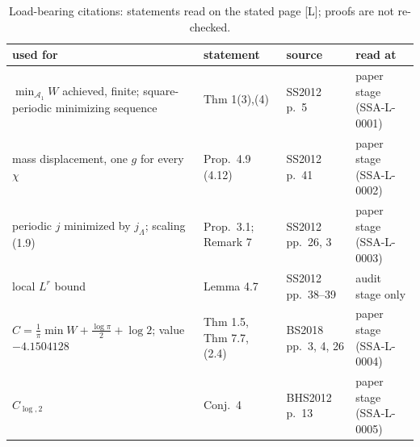 \documentclass[10pt]{article}
\newcommand{\tier}[1]{\textsf{[#1]}}
\begin{document}
\begin{table}[t]\centering\small
\caption{Load-bearing citations: statements read on the stated page \tier{L}; proofs are not re-checked.}\label{tab:cit}
\begin{tabular}{p{4.2cm}p{4.0cm}p{2.2cm}p{2.8cm}}\toprule used for & statement & source & read at\\\midrule
$\min_{\mathcal A_1}W$ achieved, finite; square-periodic minimizing sequence & Thm 1(3),(4) & SS2012 p.~5 & paper stage (SSA-L-0001)\\
mass displacement, one $g$ for every $\chi$ & Prop.\ 4.9 (4.12) & SS2012 p.~41 & paper stage (SSA-L-0002)\\
periodic $j$ minimized by $j_\Lambda$; scaling (1.9) & Prop.\ 3.1; Remark 7 & SS2012 pp.~26, 3 & paper stage (SSA-L-0003)\\
local $L^r$ bound & Lemma 4.7 & SS2012 pp.~38--39 & audit stage only\\
$C=\frac1\pi\min W+\frac{\log\pi}2+\log2$; value $-4.1504128$ & Thm 1.5, Thm 7.7, (2.4) & BS2018 pp.~3, 4, 26 & paper stage (SSA-L-0004)\\
$C_{\log,2}$ & Conj.\ 4 & BHS2012 p.~13 & paper stage (SSA-L-0005)\\\bottomrule\end{tabular}
\end{table}
\end{document}
